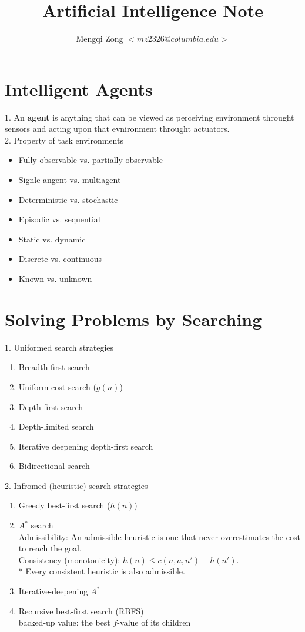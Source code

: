 \documentclass[12pt]{article}
\title{Artificial Intelligence Note}
\author{Mengqi Zong $<mz2326@columbia.edu>$}
\begin{document}
\maketitle

\setlength{\parindent}{0in}

\section{Intelligent Agents}

1. An {\bf agent} is anything that can be viewed as perceiving environment throught sensors and acting upon that evnironment throught actuators. \\

2. Property of task environments

\begin{itemize}
  \item Fully observable vs. partially observable
  \item Signle angent vs. multiagent
  \item Deterministic vs. stochastic
  \item Episodic vs. sequential
  \item Static vs. dynamic
  \item Discrete vs. continuous
  \item Known vs. unknown
\end{itemize}

\section{Solving Problems by Searching}

1. Uniformed search strategies

\begin{enumerate}
  \item Breadth-first search
  \item Uniform-cost search ($g(n)$)
  \item Depth-first search
  \item Depth-limited search
  \item Iterative deepening depth-first search
  \item Bidirectional search
\end{enumerate}

2. Infromed (heuristic) search strategies

\begin{enumerate}
  \item Greedy best-first search ($h(n)$)
  \item $A^*$ search \\
    Admissibility: An admissible heuristic is one that never overestimates the cost to reach the goal. \\
    Consistency (monotonicity): $h(n) \le c(n,a,n') + h(n')$. \\
    * Every consistent heuristic is also admissible.
  \item Iterative-deepening $A^*$
  \item Recursive best-first search (RBFS) \\
    backed-up value: the best $f$-value of its children
\end{enumerate}
\end{document}
